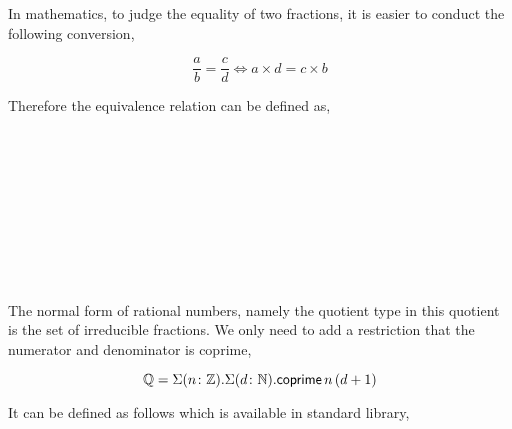 In mathematics, to judge the equality of two fractions, it is easier to conduct the following conversion,

$$ \frac{a}{b} = \frac{c}{d} \iff a \times d = c \times b $$

Therefore the equivalence relation can be defined as,

\begin{code}
\\
\>\AgdaFunction{\_*\_} \AgdaSymbol{:}     \<%
\\
\>\AgdaSymbol{(}\AgdaInductiveConstructor{+} \AgdaSymbol{)} \AgdaFunction{*}  \AgdaSymbol{=} \AgdaInductiveConstructor{+} \AgdaSymbol{(}  \AgdaSymbol{)}\<%
\\
\>\AgdaSymbol{(} \AgdaSymbol{)} \AgdaFunction{*}  \AgdaSymbol{=} \AgdaInductiveConstructor{+} \<%
\\
\>\AgdaSymbol{(} \AgdaSymbol{)} \AgdaFunction{*}   \AgdaSymbol{=}  \AgdaSymbol{(}     \AgdaSymbol{)}\<%
\\
%
\\
\> \<[35]%
\>[35]\AgdaSymbol{:}   \AgdaSymbol{\_}\<%
\\
\>\AgdaSymbol{(}  \AgdaSymbol{)}  \AgdaSymbol{(}  \AgdaSymbol{)} \AgdaSymbol{=} \<[31]%
\>[31] \AgdaFunction{*}     \AgdaFunction{*}  \<%
\\
\end{code}

The normal form of rational numbers, namely the quotient type in this quotient is the set of irreducible fractions. We only need to add a restriction that the numerator and denominator is coprime,

$$\mathbb{Q} = \Sigma (n \colon \mathbb{Z}). \Sigma (d \colon \mathbb{N}). \mathsf{coprime} \,n \,(d +1)$$

It can be defined as follows which is available in standard library,

